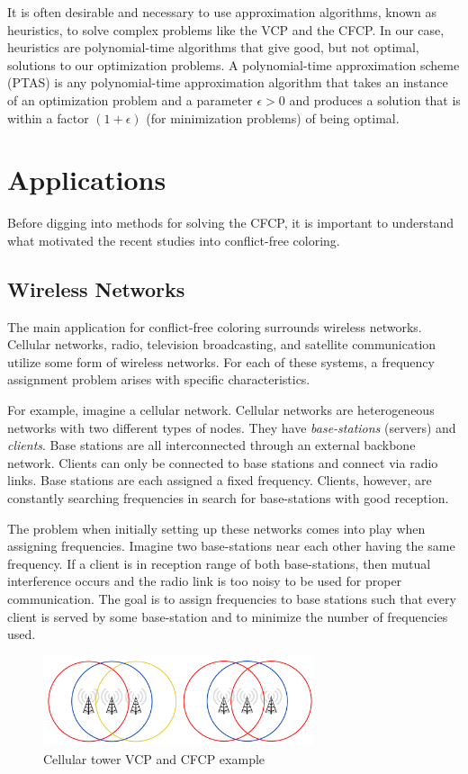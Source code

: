 \documentclass{sig-alternate}
\begin{document}
It is often desirable and necessary to use approximation algorithms, known as heuristics, to solve complex problems like the VCP and the CFCP. In our case, heuristics are polynomial-time algorithms that give good, but not optimal, solutions to our optimization problems. A polynomial-time approximation scheme (PTAS) is any polynomial-time approximation algorithm that takes an instance of an optimization problem and a parameter $\epsilon > 0$ and produces a solution that is within a factor $(1 + \epsilon)$ (for minimization problems) of being optimal.

\section{Applications}
Before digging into methods for solving the CFCP, it is important to understand what motivated the recent studies into conflict-free coloring.

\subsection{Wireless Networks}
The main application for conflict-free coloring surrounds wireless networks. Cellular networks, radio, television broadcasting, and satellite communication utilize some form of wireless networks. For each of these systems, a frequency assignment problem arises with specific characteristics.

For example, imagine a cellular network. Cellular networks are heterogeneous networks with two different types of nodes. They have \emph{base-stations} (servers) and \emph{clients}. Base stations are all interconnected through an external backbone network. Clients can only be connected to base stations and connect via radio links. Base stations are each assigned a fixed frequency. Clients, however, are constantly searching frequencies in search for base-stations with good reception.

The problem when initially setting up these networks comes into play when assigning frequencies. Imagine two base-stations near each other having the same frequency. If a client is in reception range of both base-stations, then mutual interference occurs and the radio link is too noisy to be used for proper communication. The goal is to assign frequencies to base stations such that every client is served by some base-station and to minimize the number of frequencies used.

\begin{figure}[h]
	\centering
	\includegraphics[width=8cm,trim=4 4 4 4,clip]{../figures/towers.pdf}
	\caption{Cellular tower VCP and CFCP example}\label{fig:towers}
\end{figure}
\end{document}
